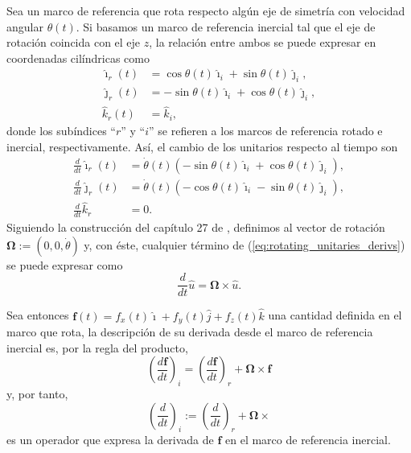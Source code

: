 
Sea un marco de referencia que rota respecto algún eje de simetría con velocidad angular $\theta(t)$. Si basamos un marco de referencia inercial tal que el eje de rotación coincida con el eje $z$, la relación entre ambos se puede expresar en coordenadas cilíndricas como
\begin{align}
 \hat{\imath}_r(t) &= \cos \theta(t) \hat{\imath}_i + \sin \theta(t) \hat{\jmath}_i, \nonumber \\
 \hat{\jmath}_r(t) &= -\sin \theta(t) \hat{\imath}_i + \cos \theta(t) \hat{\jmath}_i, \nonumber \\
 \hat{k}_r(t) &= \hat{k}_i,
 \label{eq:rotating_unitaries}
\end{align}
donde los subíndices ``$r$'' y ``$i$'' se refieren a los marcos de referencia rotado e inercial, respectivamente. Así, el cambio de los unitarios respecto al tiempo son
\begin{align}
 \frac{d}{dt} \hat{\imath}_r(t) &= \dot{\theta}(t) \left( -\sin \theta(t) \hat{\imath}_i + \cos \theta(t) \hat{\jmath}_i  \right), \nonumber \\
 \frac{d}{dt} \hat{\jmath}_r(t) &= \dot{\theta}(t) \left( -\cos \theta(t) \hat{\imath}_i - \sin \theta(t) \hat{\jmath}_i \right), \nonumber \\
 \frac{d}{dt} \hat{k}_r &= 0.
 \label{eq:rotating_unitaries_derivs}
\end{align}
Siguiendo la construcción del capítulo 27 de \cite{Arnold1989}, definimos al vector de rotación $\mathbf{\Omega} := \left( 0, 0, \dot{\theta} \right)$ y, con éste, cualquier término de (\ref{eq:rotating_unitaries_derivs}) se puede expresar como
\begin{equation}
 \frac{d}{dt}\hat{u} = \mathbf{\Omega} \times \hat{u}.
\end{equation}

Sea entonces $\mathbf{f}(t) = f_x(t) \hat{\imath} + f_y(t) \hat{j} + f_z(t) \hat{k}$ una cantidad definida en el marco que rota, la descripción de su derivada desde el marco de referencia inercial es, por la regla del producto,
\begin{equation*}
 \left( \frac{d \mathbf{f}}{dt} \right)_i = \left( \frac{d\mathbf{f}}{dt} \right)_r  + \mathbf{\Omega} \times \mathbf{f}
\end{equation*}
y, por tanto,
\begin{equation}
 \left(\frac{d}{dt}\right)_i := \left( \frac{d}{dt} \right)_r + \mathbf{\Omega} \times
 \label{eq:rotating_derivative}
\end{equation}
es un operador que expresa la derivada de $\mathbf{f}$ en el marco de referencia inercial.

